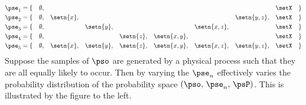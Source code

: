 \begin{example}
\begin{minipage}[c]{2\tw/3}
  \begin{align*}
    \pse_{ 1} &=\{ && \emptyset, &&           &&           &&           &&             &&             &&             && \setX && \}\\
    \pse_{ 2} &=\{ && \emptyset, && \setn{x}, &&           &&           &&             &&             && \setn{y,z}, && \setX && \}\\
    \pse_{ 3} &=\{ && \emptyset, &&           && \setn{y}, &&           &&             && \setn{x,z}, &&             && \setX && \}\\
    \pse_{ 4} &=\{ && \emptyset, &&           &&           && \setn{z}, && \setn{x,y}, &&             &&             && \setX && \}\\
    \pse_{ 5} &=\{ && \emptyset, && \setn{x}, && \setn{y}, && \setn{z}, && \setn{x,y}, && \setn{x,z}, && \setn{y,z}, && \setX && \}\\
  \end{align*}
Suppose the samples of $\pso$ are generated by a physical process such that they are all
equally likely to occur.
Then by varying the  $\pse_n$ effectively varies the probability
distribution of the probability space $(\pso,\, \pse_n,\, \psP)$.
This is illustrated by the figure to the left.
\end{minipage}
\end{example}













